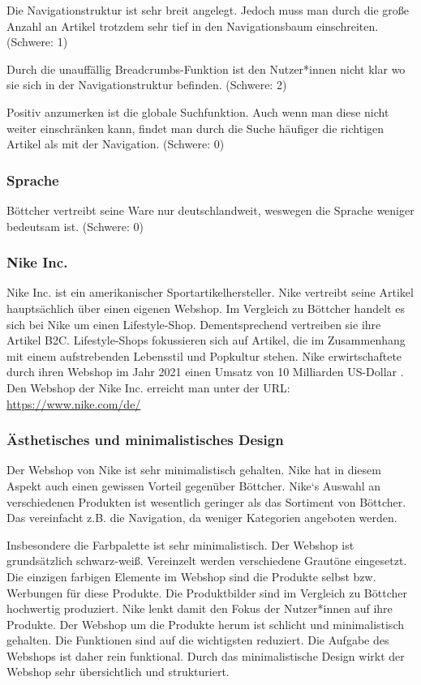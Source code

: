 \documentclass[utf8,biblatex]{lni}
\begin{document}
Die Navigationstruktur ist sehr breit angelegt. Jedoch muss man durch die große Anzahl an Artikel trotzdem sehr tief in den Navigationsbaum einschreiten. (Schwere: 1)

Durch die unauffällig Breadcrumbs-Funktion ist den Nutzer*innen nicht klar wo sie sich in der Navigationstruktur befinden. (Schwere: 2)

Positiv anzumerken ist die globale Suchfunktion. Auch wenn man diese nicht weiter einschränken kann, findet man durch die Suche häufiger die richtigen Artikel als mit der Navigation. (Schwere: 0)


\subsubsection*{Sprache}
Böttcher vertreibt seine Ware nur deutschlandweit, weswegen die Sprache weniger bedeutsam ist. (Schwere: 0)


\subsubsection{Nike Inc.}
Nike Inc. ist ein amerikanischer Sportartikelhersteller. Nike vertreibt seine Artikel hauptsächlich über einen eigenen Webshop. Im Vergleich zu Böttcher handelt es sich bei Nike um einen Lifestyle-Shop. Dementsprechend vertreiben sie ihre Artikel B2C. Lifestyle-Shops fokussieren sich auf Artikel, die im Zusammenhang mit einem aufstrebenden Lebensstil und Popkultur stehen. Nike erwirtschaftete durch ihren Webshop im Jahr 2021 einen Umsatz von 10 Milliarden US-Dollar \cite{Peters2022}. Den Webshop der Nike Inc. erreicht man unter der URL: \url{https://www.nike.com/de/}


\subsubsection*{Ästhetisches und minimalistisches Design}
Der Webshop von Nike ist sehr minimalistisch gehalten. Nike hat in diesem Aspekt auch einen gewissen Vorteil gegenüber Böttcher. Nike‘s Auswahl an verschiedenen Produkten ist wesentlich geringer als das Sortiment von Böttcher. Das vereinfacht z.B. die Navigation, da weniger Kategorien angeboten werden.

Insbesondere die Farbpalette ist sehr minimalistisch. Der Webshop ist grundsätzlich schwarz-weiß. Vereinzelt werden verschiedene Grautöne eingesetzt. Die einzigen farbigen Elemente im Webshop sind die Produkte selbst bzw. Werbungen für diese Produkte. Die Produktbilder sind im Vergleich zu Böttcher hochwertig produziert. Nike lenkt damit den Fokus der Nutzer*innen auf ihre Produkte. Der Webshop um die Produkte herum ist schlicht und minimalistisch gehalten. Die Funktionen sind auf die wichtigsten reduziert. Die Aufgabe des Webshops ist daher rein funktional. Durch das minimalistische Design wirkt der Webshop sehr übersichtlich und strukturiert.
\end{document}
